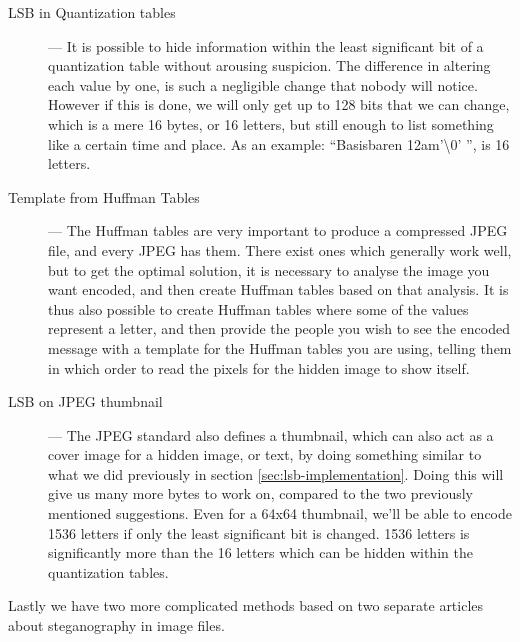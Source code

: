 \begin{description}
	\item[LSB in Quantization tables] ---
	It is possible to hide information within the least significant bit of a quantization table without arousing suspicion.
	The difference in altering each value by one, is such a negligible change that nobody will notice.
	However if this is done, we will only get up to 128 bits that we can change, which is a mere 16 bytes, or 16 letters, but still enough to list something like a certain time and place.
	As an example: ``Basisbaren 12am'\textbackslash0' '', is 16 letters.
	
	\item[Template from Huffman Tables] ---
	The Huffman tables are very important to produce a compressed JPEG file, and every JPEG has them.
	There exist ones which generally work well, but to get the optimal solution, it is necessary to analyse the image you want encoded, and then create Huffman tables based on that analysis.
	It is thus also possible to create Huffman tables where some of the values represent a letter, and then provide the people you wish to see the encoded message with a template for the Huffman tables you are using, telling them in which order to read the pixels for the hidden image to show itself.
	
	\item[LSB on JPEG thumbnail] ---
	The JPEG standard also defines a thumbnail, which can also act as a cover image for a hidden image, or text, by doing something similar to what we did previously in section \ref{sec:lsb-implementation}.
	Doing this will give us many more bytes to work on, compared to the two previously mentioned suggestions.
	Even for a 64x64 thumbnail, we'll be able to encode 1536 letters if only the least significant bit is changed. 1536 letters is significantly more than the 16 letters which can be hidden within the quantization tables.
\end{description}

\noindent Lastly we have two more complicated methods based on two separate articles about steganography in image files.  

